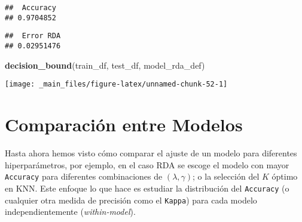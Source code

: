 \documentclass[]{book}
\newenvironment{Shaded}{\begin{snugshade}}{\end{snugshade}}
\newcommand{\CommentTok}[1]{\textcolor[rgb]{0.56,0.35,0.01}{\textit{#1}}}
\newcommand{\DataTypeTok}[1]{\textcolor[rgb]{0.13,0.29,0.53}{#1}}
\newcommand{\DecValTok}[1]{\textcolor[rgb]{0.00,0.00,0.81}{#1}}
\newcommand{\KeywordTok}[1]{\textcolor[rgb]{0.13,0.29,0.53}{\textbf{#1}}}
\newcommand{\NormalTok}[1]{#1}
\newcommand{\OperatorTok}[1]{\textcolor[rgb]{0.81,0.36,0.00}{\textbf{#1}}}
\newcommand{\StringTok}[1]{\textcolor[rgb]{0.31,0.60,0.02}{#1}}
\begin{document}
\begin{Shaded}
\end{Shaded}

\begin{verbatim}
##  Accuracy 
## 0.9704852
\end{verbatim}

\begin{Shaded}
\end{Shaded}

\begin{verbatim}
##  Error RDA 
## 0.02951476
\end{verbatim}

\begin{Shaded}
\begin{Highlighting}[]
\KeywordTok{decision_bound}\NormalTok{(train_df, test_df, model_rda_def)}
\end{Highlighting}
\end{Shaded}

\begin{center}\texttt{[image: \_main\_files/figure-latex/unnamed-chunk-52-1]} \end{center}

\hypertarget{compara}{%
\chapter{Comparación entre Modelos}\label{compara}}

Hasta ahora hemos visto cómo comparar el ajuste de un modelo para diferentes hiperparámetros, por ejemplo, en el caso RDA se escoge el modelo con mayor \texttt{Accuracy} para diferentes combinaciones de \((\lambda, \gamma)\); o la selección del \(K\) óptimo en KNN. Este enfoque lo que hace es estudiar la distribución del \texttt{Accuracy} (o cualquier otra medida de precisión como el \texttt{Kappa}) para cada modelo independientemente (\emph{within-model}).
\end{document}
